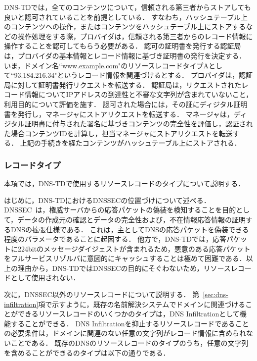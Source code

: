 DNS-TDでは，全てのコンテンツについて，信頼される第三者からストアしても良いと認可されていることを前提としている．
すなわち，ハッシュテーブル上のコンテンツへの操作，またはコンテンツをハッシュテーブル上にストアするなどの操作処理をする際，プロバイダは，信頼される第三者からのレコード情報に操作することを認可してもらう必要がある．
認可の証明書を発行する認証局は，プロバイダの基本情報とレコード情報に基づき証明書の発行を決定する．
いま，ドメイン名``www.example.com"のリソースレコードタイプAとして``93.184.216.34"というレコード情報を関連づけるとする．
プロバイダは，認証局に対して証明書発行リクエストを転送する．
認証局は，リクエストされたレコード情報についてIPアドレスの到達性と不審な文字列が含まれていないこと，利用目的について評価を施す．
認可された場合には，その証にディジタル証明書を発行し，マネージャにストアリクエストを転送する．
マネージャは，ディジタル証明書に付与された署名に基づきコンテンツの完全性を評価し，認証された場合コンテンツIDを計算し，担当マネージャにストアリクエストを転送する．
上記の手続きを経たコンテンツがハッシュテーブル上にストアされる．


\subsubsection{レコードタイプ}
本項では，DNS-TDで使用するリソースレコードのタイプについて説明する．

はじめに，DNS-TDにおけるDNSSECの位置づけについて述べる．
DNSSEC~\cite{rfc4033}は，権威サーバからの応答パケットの偽装を検知することを目的として，データの作成元の確認とデータの完全性および，不在情報応答情報の証明するDNSの拡張仕様である．
これは，主としてDNSの応答パケットを偽装できる程度のパラメータであることに起因する．
他方で，DNS-TDでは，応答パケットに224bitのメッセージダイジェストが含まれるため，悪意のある応答パケットをフルサービスリゾルバに意図的にキャッシュすることは極めて困難である．以上の理由から，DNS-TDではDNSSECの目的にそぐわないため，リソースレコードとして使用されない．

次に，DNSSEC以外のリソースレコードについて説明する．
第~\ref{sec:dns-infiltration}項で示すように，既存の名前解決システムでドメインに関連づけることができるリソースレコードのいくつかのタイプは，DNS Infiltrationとして機能することができる．
DNS Infiltrationを抑止するリソースレコードであることの必要条件は，ドメインに関連のない任意の文字列がレコード情報に含められないことである．
既存のDNSのリソースレコードのタイプのうち，任意の文字列を含めることができるのタイプは以下の通りである．



